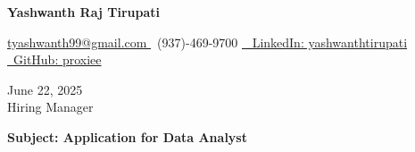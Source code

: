 \documentclass[letterpaper,11pt]{article}
\begin{document}
\begin{center}
    \textbf{\LARGE Yashwanth Raj Tirupati}
    \vspace{4pt}
    
    \small
    \href{mailto:tyashwanth99@gmail.com}{ tyashwanth99@gmail.com }\textbar
     ~(937)-469-9700 \textbar
    \href{https://linkedin.com/in/yashwanthtirupati}{~ LinkedIn: yashwanthtirupati }\textbar 
    \href{https://github.com/proxiee}{~GitHub: proxiee }
\end{center}

\vspace{20pt}

\begin{flushleft}
    June 22, 2025 \\
    \vspace{12pt}
    Hiring Manager \\
\end{flushleft}


\begin{flushleft}
\textbf{Subject: Application for Data Analyst}
\end{flushleft}


\end{document}
